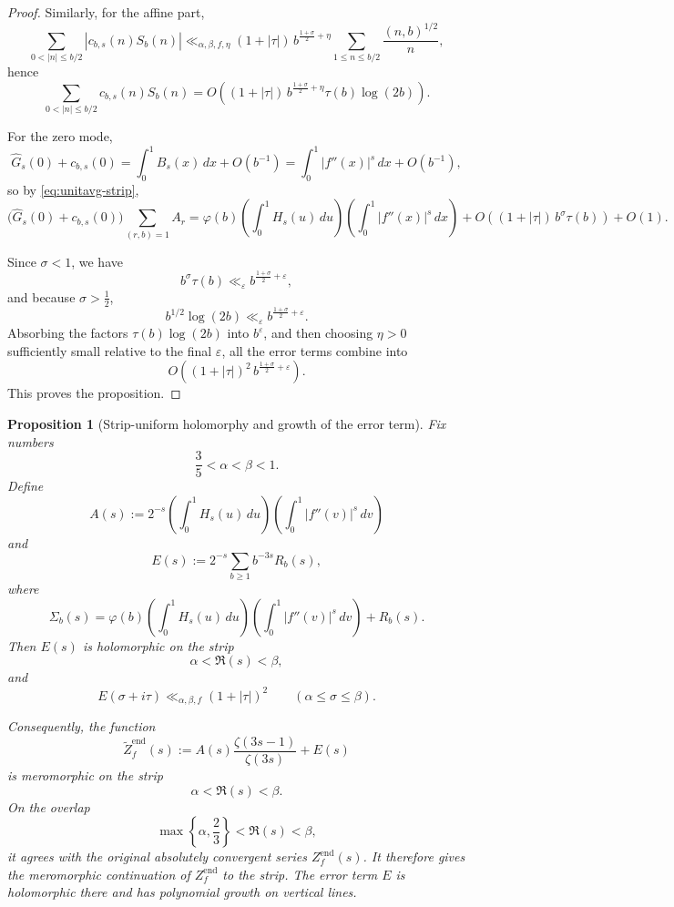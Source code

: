 \documentclass[a4paper,american,11pt]{amsart}
\theoremstyle{plain}
\newtheorem{proposition}[theorem]{Proposition}
\theoremstyle{definition}
\begin{document}
\begin{proof}
Similarly, for the affine part,
\[
\sum_{0<|n|\le b/2}|c_{b,s}(n)S_b(n)|
\ll_{\alpha,\beta,f,\eta}
(1+|\tau|)\,b^{\frac{1+\sigma}{2}+\eta}
\sum_{1\le n\le b/2}\frac{(n,b)^{1/2}}{n},
\]
hence
\[
\sum_{0<|n|\le b/2}c_{b,s}(n)S_b(n)
=
O\!\left((1+|\tau|)\,b^{\frac{1+\sigma}{2}+\eta}\tau(b)\log(2b)\right).
\]

For the zero mode,
\[
\widehat G_s(0)+c_{b,s}(0)
=
\int_0^1 B_s(x)\,dx+O(b^{-1})
=
\int_0^1 |f''(x)|^s\,dx+O(b^{-1}),
\]
so by \eqref{eq:unitavg-strip},
\[
\bigl(\widehat G_s(0)+c_{b,s}(0)\bigr)\sum_{(r,b)=1}A_r
=
\varphi(b)\left(\int_0^1 H_s(u)\,du\right)\left(\int_0^1 |f''(x)|^s\,dx\right)
+
O\!\left((1+|\tau|)\,b^\sigma\tau(b)\right)
+
O(1).
\]

Since \(\sigma<1\), we have
\[
b^\sigma\tau(b)\ll_\varepsilon b^{\frac{1+\sigma}{2}+\varepsilon},
\]
and because \(\sigma>\tfrac12\),
\[
b^{1/2}\log(2b)\ll_\varepsilon b^{\frac{1+\sigma}{2}+\varepsilon}.
\]
Absorbing the factors \(\tau(b)\log(2b)\) into \(b^\varepsilon\), and then choosing \(\eta>0\)
sufficiently small relative to the final \(\varepsilon\), all the error terms combine into
\[
O\!\left((1+|\tau|)^2\,b^{\frac{1+\sigma}{2}+\varepsilon}\right).
\]
This proves the proposition.
\end{proof}

\begin{proposition}[Strip-uniform holomorphy and growth of the error term]
\label{prop:E-strip}
Fix numbers
\[
\frac35<\alpha<\beta<1.
\]
Define
\[
A(s):=
2^{-s}\left(\int_0^1 H_s(u)\,du\right)\left(\int_0^1 |f''(v)|^s\,dv\right)
\]
and
\[
E(s):=
2^{-s}\sum_{b\ge1} b^{-3s}R_b(s),
\]
where
\[
\Sigma_b(s)
=
\varphi(b)\left(\int_0^1 H_s(u)\,du\right)\left(\int_0^1 |f''(v)|^s\,dv\right)
+
R_b(s).
\]
Then \(E(s)\) is holomorphic on the strip
\[
\alpha<\Re(s)<\beta,
\]
and
\[
E(\sigma+i\tau)\ll_{\alpha,\beta,f}(1+|\tau|)^2
\qquad (\alpha\le \sigma\le \beta).
\]

Consequently, the function
\[
\widetilde Z_f^{\mathrm{end}}(s)
:=
A(s)\frac{\zeta(3s-1)}{\zeta(3s)}+E(s)
\]
is meromorphic on the strip
\[
\alpha<\Re(s)<\beta.
\]
On the overlap
\[
\max\left\{\alpha,\frac23\right\}<\Re(s)<\beta,
\]
it agrees with the original absolutely convergent series
\(Z_f^{\mathrm{end}}(s)\). It therefore gives the meromorphic continuation
of \(Z_f^{\mathrm{end}}\) to the strip. The error term \(E\) is holomorphic
there and has polynomial growth on vertical lines.

\end{proposition}
\end{document}
